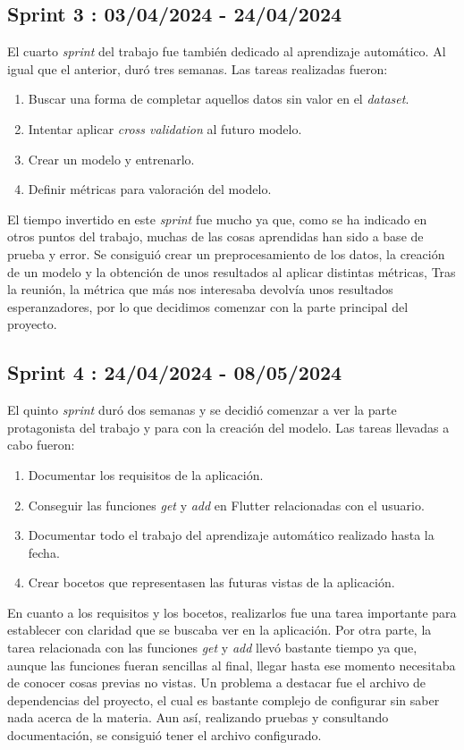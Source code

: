 \subsection{Sprint 3 : 03/04/2024 - 24/04/2024}

	El cuarto \emph{sprint} del trabajo fue también dedicado al aprendizaje automático. Al igual que el anterior, duró tres semanas. Las tareas realizadas fueron:
	\begin{enumerate}
		\item Buscar una forma de completar aquellos datos sin valor en el \emph{dataset}.
		\item Intentar aplicar \emph{cross validation} al futuro modelo.
		\item Crear un modelo y entrenarlo.
		\item Definir métricas para valoración del modelo.
	\end{enumerate}
	El tiempo invertido en este \emph{sprint} fue mucho ya que, como se ha indicado en otros puntos del trabajo, muchas de las cosas aprendidas han sido a base de prueba y error. Se consiguió crear un preprocesamiento de los datos, la creación de un modelo y la obtención de unos resultados al aplicar distintas métricas, Tras la reunión, la métrica que más nos interesaba devolvía unos resultados esperanzadores, por lo que decidimos comenzar con la parte principal del proyecto.
	
\subsection{Sprint 4 : 24/04/2024 - 08/05/2024}

	El quinto \emph{sprint} duró dos semanas y se decidió comenzar a ver la parte protagonista del trabajo y para con la creación del modelo. Las tareas llevadas a cabo fueron:
	\begin{enumerate}
		\item Documentar los requisitos de la aplicación.
		\item Conseguir las funciones \emph{get} y \emph{add} en Flutter relacionadas con el usuario.
		\item Documentar todo el trabajo del aprendizaje automático realizado hasta la fecha.
		\item Crear bocetos que representasen las futuras vistas de la aplicación.
	\end{enumerate}
	En cuanto a los requisitos y los bocetos, realizarlos fue una tarea importante para establecer con claridad que se buscaba ver en la aplicación. Por otra parte, la tarea relacionada con las funciones \emph{get} y \emph{add} llevó bastante tiempo ya que, aunque las funciones fueran sencillas al final, llegar hasta ese momento necesitaba de conocer cosas previas no vistas. Un problema a destacar fue el archivo de dependencias del proyecto, el cual es bastante complejo de configurar sin saber nada acerca de la materia. Aun así, realizando pruebas y consultando documentación, se consiguió tener el archivo configurado.
	
